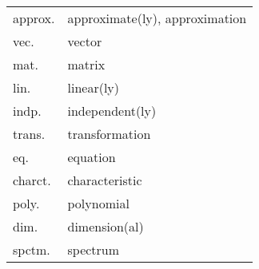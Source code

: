 %
%

\setcounter{page}{1}

\begin{tabular}{l|l}
	approx. & approximate(ly), approximation \\
	vec. & vector \\
	mat. & matrix \\
	lin. & linear(ly) \\
	indp. & independent(ly) \\
	trans. & transformation \\
	eq. & equation \\
	charct. & characteristic \\
	poly. & polynomial \\
	dim. & dimension(al) \\
	spctm. & spectrum \\
\end{tabular}
